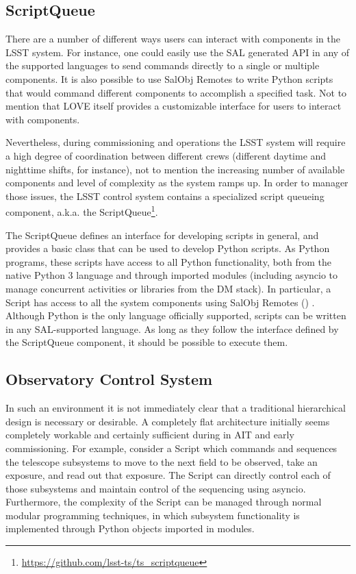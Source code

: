 \subsection{ScriptQueue} \label{sect:scriptq}
There are a number of different ways users can interact with components in the LSST system. For instance, one could easily use the SAL generated API in any of the supported languages to send commands directly to a single or multiple components. It is also possible to use SalObj Remotes to write Python scripts that would command different components to accomplish a specified task. Not to mention that LOVE itself provides a customizable interface for users to interact with components. 

Nevertheless, during commissioning and operations the LSST system will require a high degree of coordination between different crews (different daytime and nighttime shifts, for instance), not to mention the increasing number of available components and level of complexity as the system ramps up. In order to manager those issues, the LSST control system contains a specialized script queueing component, a.k.a. the ScriptQueue\footnote{\url{https://github.com/lsst-ts/ts_scriptqueue}}.

The ScriptQueue defines an interface for developing scripts in general, and provides a basic class that can be used to develop Python scripts. As Python programs, these scripts have access to all Python functionality, both from the native Python 3 language and through imported modules (including asyncio to manage concurrent activities or libraries from the DM stack). In particular, a Script has access to all the system components using SalObj Remotes () . Although Python is the only language officially supported, scripts can be written in any SAL-supported language. As long as they follow the interface defined by the ScriptQueue component, it should be possible to execute them. 

\subsection{Observatory Control System } \label{sect:ocs}
In such an environment it is not immediately clear that a traditional hierarchical design is necessary or desirable. A completely flat architecture initially seems completely workable and certainly sufficient during in AIT and early commissioning. For example, consider a Script which commands and sequences the telescope subsystems to move to the next field to be observed, take an exposure, and read out that exposure. The Script can directly control each of those subsystems and maintain control of the sequencing using asyncio. Furthermore, the complexity of the Script can be managed through normal modular programming techniques, in which subsystem functionality is implemented through Python objects imported in modules.

